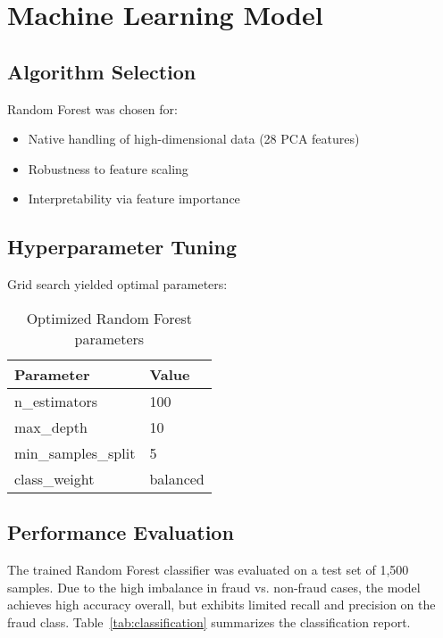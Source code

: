 \documentclass[12pt]{article}
\begin{document}
\section{Machine Learning Model}
\subsection{Algorithm Selection}
Random Forest was chosen for:
\begin{itemize}[leftmargin=*]
    \item Native handling of high-dimensional data (28 PCA features)
    \item Robustness to feature scaling
    \item Interpretability via feature importance
\end{itemize}

\subsection{Hyperparameter Tuning}
Grid search yielded optimal parameters:
\begin{table}[h!]
\centering
\begin{tabular}{@{}ll@{}}
\toprule
\textbf{Parameter} & \textbf{Value} \\ \midrule
n\_estimators & 100 \\
max\_depth & 10 \\
min\_samples\_split & 5 \\
class\_weight & balanced \\
\bottomrule
\end{tabular}
\caption{Optimized Random Forest parameters}
\end{table}

\subsection{Performance Evaluation}

The trained Random Forest classifier was evaluated on a test set of 1,500 samples. Due to the high imbalance in fraud vs. non-fraud cases, the model achieves high accuracy overall, but exhibits limited recall and precision on the fraud class. Table~\ref{tab:classification} summarizes the classification report.
\end{document}
